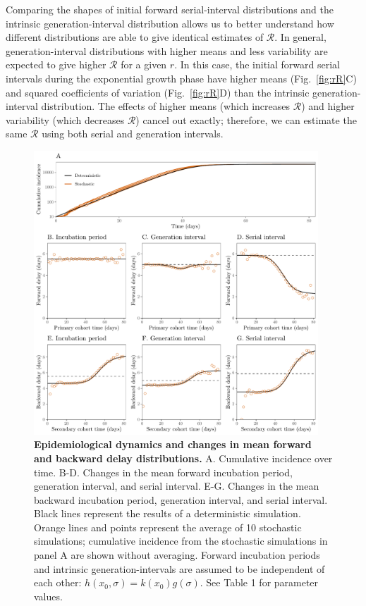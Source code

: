 \documentclass[12pt]{article}
\newcommand{\fref}[1]{Fig.~\ref{fig:#1}}
\begin{document}
Comparing the shapes of initial forward serial-interval distributions and the intrinsic generation-interval distribution allows us to better understand how different distributions are able to give identical estimates of $\mathcal R$.
In general, generation-interval distributions with higher means and less variability are expected to give higher $\mathcal R$ for a given $r$.
In this case, the initial forward serial intervals during the exponential growth phase have higher means (\fref{rR}C) and squared coefficients of variation (\fref{rR}D) than the intrinsic generation-interval distribution.
The effects of higher means (which increases $\mathcal R$) and higher variability (which decreases $\mathcal R$) cancel out exactly;
therefore, we can estimate the same $\mathcal R$ using both serial and generation intervals.

\begin{figure}[!ht]
\begin{center}
\includegraphics[width=0.95\textwidth]{forward.pdf}
\caption{
\textbf{Epidemiological dynamics and changes in mean forward and backward delay distributions.}
A. Cumulative incidence over time.
B-D. Changes in the mean forward incubation period, generation interval, and serial interval.
E-G. Changes in the mean backward incubation period, generation interval, and serial interval.
Black lines represent the results of a deterministic simulation.
Orange lines and points represent the average of 10 stochastic simulations;
cumulative incidence from the stochastic simulations in panel A are shown without averaging.
Forward incubation periods and intrinsic generation-intervals are assumed to be independent of each other: $h(x_0, \sigma) = k(x_0) g(\sigma)$.
See Table 1 for parameter values.
}
\end{center}
\label{fig:epi}
\end{figure}
\end{document}

